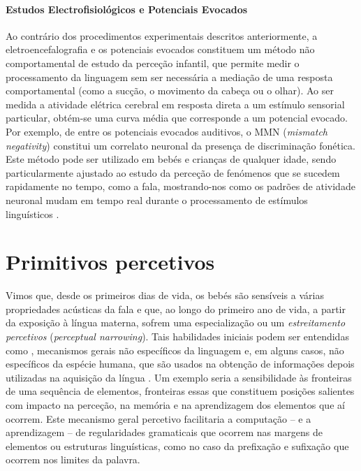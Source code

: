 \documentclass[output=paper]{LSP/langsci}
\begin{document}
\paragraph*{Estudos Electrofisiológicos e Potenciais Evocados}
Ao contrário dos procedimentos experimentais descritos anteriormente, a eletroencefalografia e os potenciais evocados constituem um método não comportamental de estudo da perceção infantil, que permite medir o processamento da linguagem sem ser necessária a mediação de uma resposta comportamental (como a sucção, o movimento da cabeça ou o olhar). Ao ser medida a atividade elétrica cerebral em resposta direta a um estímulo sensorial particular, obtém-se uma curva média que corresponde a um potencial evocado. Por exemplo, de entre os potenciais evocados auditivos, o MMN (\textit{mismatch negativity}) constitui um correlato neuronal da presença de discriminação fonética. Este método pode ser utilizado em bebés e crianças de qualquer idade, sendo particularmente ajustado ao estudo da perceção de fenómenos que se sucedem rapidamente no tempo, como a fala, mostrando-nos como os padrões de atividade neuronal mudam em tempo real durante o processamento de estímulos linguísticos \citep{kuhlrivera2008}.

\section{Primitivos percetivos}
\label{sec:frota_primitivos}
Vimos que, desde os primeiros dias de vida, os bebés são sensíveis a várias propriedades acústicas da fala e que, ao longo do primeiro ano de vida, a partir da exposição à língua materna, sofrem uma especialização ou um \textit{estreitamento percetivos} (\textit{perceptual narrowing}). Tais habilidades iniciais podem ser entendidas como , mecanismos gerais não específicos da linguagem e, em alguns casos, não específicos da espécie humana, que são usados na obtenção de informações depois utilizadas na aquisição da língua \citep{gervainmehler2010}. Um exemplo seria a sensibilidade às fronteiras de uma sequência de elementos, fronteiras essas que constituem posições salientes com impacto na perceção, na memória e na aprendizagem dos elementos que aí ocorrem. Este mecanismo geral percetivo facilitaria a computação -- e a aprendizagem -- de regularidades gramaticais que ocorrem nas margens de elementos ou estruturas linguísticas, como no caso da prefixação e sufixação que ocorrem nos limites da palavra. 
\end{document}
